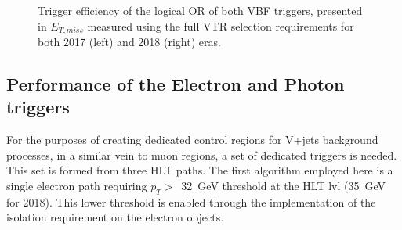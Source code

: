 \begin{figure}[htbp]
  \centering
  \caption{Trigger efficiency of the logical OR of both VBF triggers, presented in $E_{T,miss}$ measured using the full VTR selection requirements for both 2017 (left) and 2018 (right) eras.}
  \label{fig:vbf_trig_eff_final}
\end{figure}

\subsection{Performance of the Electron and Photon triggers}
\hspace{10pt} For the purposes of creating dedicated control regions for V+jets background processes, in a similar vein to muon regions, a set of dedicated triggers is needed. This set is formed from three HLT paths. The first algorithm employed here is a single electron path requiring $p_T>$~32~GeV threshold at the HLT lvl (35~GeV for 2018). This lower threshold is enabled through the implementation of the isolation requirement on the electron objects.

